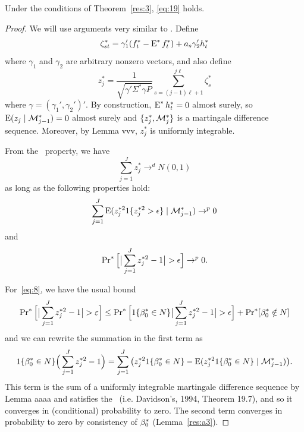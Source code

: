 \documentclass[12pt,fleqn]{article}
\begin{document}
\begin{lema}
  Under the conditions of Theorem~\ref{res:3}, \eqref{eq:19} holds.
\end{lema}
\begin{proof}

  We will use arguments very similar to \cite{Cal:14}. Define
  \[
  \zeta_{st}^* = \gamma_1'(f_t^* - \operatorname{E}^* f_t^*) + a_s \gamma_2' h_t^*
  \]
  where $\gamma_1$ and $\gamma_2$ are arbitrary nonzero vectors, and
  also define
  \[
  z_j^* = \frac{1}{\sqrt{\gamma'\Sigma^*\gamma P}} \sum_{s=(j-1) \ell + 1}^{j\ell} \zeta_s^*
  \]
  where $\gamma = (\gamma_1', \gamma_2')'$. By construction, $\operatorname{E}^*
  h_t^* = 0$ almost surely, so $\operatorname{E}(z_j \mid \mathcal{M}_{j-1}^*) = 0$ almost
  surely and $\{z_j^*, \mathcal{M}_j^*\}$ is a martingale difference sequence.
  Moreover, by Lemma vvv, $z_j^*$ is uniformly integrable.

  From the \mds\ property, we have
  \begin{equation*}
    \sum_{j=1}^J z_j^* \to^d N(0, 1)
  \end{equation*}
  as long as the following properties hold:
  \begin{equation}\label{eq:7}
    \sum_{j=1}^J \operatorname{E}(z_j^{*2} 1\{z_j^{*2} > \epsilon\} \mid \mathcal{M}_{j-1}^*) \to^p 0
  \end{equation}
  and
  \begin{equation}\label{eq:8}
    \operatorname{Pr}^*\Big[ \big| \sum_{j=1}^J z_j^{*2} - 1 \big| > \epsilon\Big] \to^p 0.
  \end{equation}

  For~\eqref{eq:8}, we have the usual bound
  \begin{equation*}
    \operatorname{Pr}^*\Big[ \big|\sum_{j=1}^J z_j^{*2} - 1 \big| > \varepsilon\Big] \leq
    \operatorname{Pr}^*\Big[ 1\{\beta_0^* \in N\} \big| \sum_{j=1}^J z_j^{*2} - 1 \big| > \epsilon \Big]
     + \operatorname{Pr}^*[ \beta_0^* \notin N ]
  \end{equation*}
  and we can rewrite the summation in the first term as
  \begin{equation*}
    1\{\beta_0^* \in N\} \Big( \sum_{j=1}^J z_j^{*2} - 1 \Big)
    =  \sum_{j=1}^J \big(z_j^{*2}1\{\beta_0^* \in N\} - \operatorname{E}(z_j^{*2} 1\{\beta_0^* \in N\} \mid \mathcal{M}_{j-1}^*) \big).
   \end{equation*}
   This term is the sum of a uniformly integrable martingale
   difference sequence by Lemma aaaa and satisfies the \lln\
   (i.e. Davidson's, 1994, Theorem 19.7), and so it converges in
   (conditional) probability to zero.  The second term converges in
   probability to zero by consistency of $\beta_0^*$
   (Lemma~\ref{res:a3}).


\end{proof}
\end{document}

